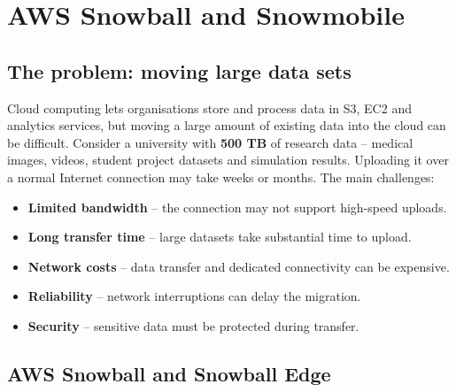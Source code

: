 \documentclass[11pt,a4paper]{article}
\begin{document}

\section{AWS Snowball and Snowmobile}

\subsection{The problem: moving large data sets}

Cloud computing lets organisations store and process data in S3, EC2 and analytics services,
but moving a large amount of existing data into the cloud can be difficult. Consider a
university with \textbf{500 TB} of research data -- medical images, videos, student project
datasets and simulation results. Uploading it over a normal Internet connection may take
weeks or months. The main challenges:

\begin{itemize}\itemsep2pt
  \item \textbf{Limited bandwidth} -- the connection may not support high-speed uploads.
  \item \textbf{Long transfer time} -- large datasets take substantial time to upload.
  \item \textbf{Network costs} -- data transfer and dedicated connectivity can be expensive.
  \item \textbf{Reliability} -- network interruptions can delay the migration.
  \item \textbf{Security} -- sensitive data must be protected during transfer.
\end{itemize}

\subsection{AWS Snowball and Snowball Edge}


\end{document}
